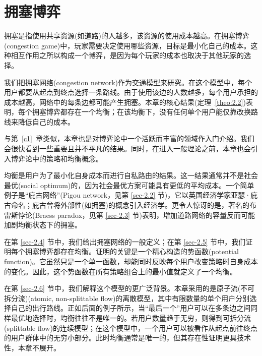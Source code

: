 \chapter{拥塞博弈}\label{c2}

\makeatletter


\renewcommand{\theequation}{\thechapter.\arabic{equation}}

\makeatother



拥塞是指使用共享资源(如道路)的人越多，该资源的使用成本越高。在拥塞博弈(congestion game)中，玩家需要决定使用哪些资源，目标是最小化自己的成本。这种相互作用之所以构成一个博弈，是因为每个玩家的成本也取决于其他玩家的选择。

我们把拥塞网络(congestion network)作为交通模型来研究。在这个模型中，每个用户都要从起点到终点选择一条路线。由于使用该边的人数越多，每个用户承担的成本越高，网络中的每条边都可能产生拥塞。本章的核心结果(定理~\ref{theo:2.2})表明，每个拥塞博弈都存在一个均衡；在该均衡下，没有任何单个用户能仅靠改换路线来降低自己的成本。

与第~\ref{c1}~章类似，本章也是对博弈论中一个活跃而丰富的领域作入门介绍。我们会很快看到一些重要且并不平凡的结果。同时，在进入一般理论之前，本章也会引入博弈论中的策略和均衡概念。

均衡是用户为了最小化自身成本而进行自私路由的结果。这一结果通常并不是社会最优(social optimum)的，因为社会最优方案可能具有更低的平均成本。一个简单例子是“庇古网络”(Pigou network，见第 \ref{sec-2.2} 节)，它以英国经济学家亚瑟·庇古命名；庇古曾将外部性(如拥塞)的概念引入经济学。更令人惊讶的是，著名的布雷斯悖论(Braess paradox，见第 \ref{sec-2.3} 节)表明，增加道路网络的容量反而可能加剧均衡状态下的拥塞。

在第 \ref{sec-2.4} 节中，我们给出拥塞网络的一般定义；在第 \ref{sec-2.5} 节中，我们证明每个拥塞博弈都存在均衡。证明的关键是一个精心构造的势函数(potential function)。它虽然只是一个单一函数，却能同时反映每个用户改变策略时自身成本的变化。因此，这个势函数在所有策略组合上的最小值就定义了一个均衡。

在第 \ref{sec-2.6} 节中，我们解释这个模型的更广泛背景。本章采用的是原子流(不可拆分流)(atomic, non-splittable flow)的离散模型，其中有限数量的单个用户分别选择自己的出行路线。正如后面的例子所示，当“最后一个”用户可以在多条边之间同样最优地选择时，均衡往往不是唯一的。若用户数量趋于无穷，则得到可拆分流(splittable flow)的连续模型；在这个模型中，一个用户可以被看作从起点前往终点的用户群体中的无穷小部分。此时均衡通常是唯一的，但其存在性证明更具技术性，本章不展开。

